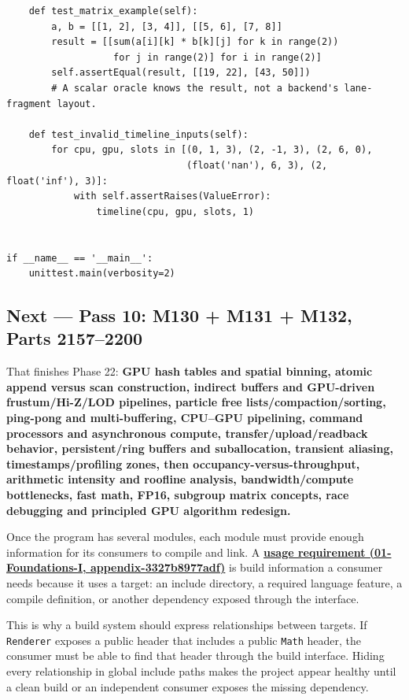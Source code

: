 \begin{verbatim}
    def test_matrix_example(self):
        a, b = [[1, 2], [3, 4]], [[5, 6], [7, 8]]
        result = [[sum(a[i][k] * b[k][j] for k in range(2))
                   for j in range(2)] for i in range(2)]
        self.assertEqual(result, [[19, 22], [43, 50]])
        # A scalar oracle knows the result, not a backend's lane-fragment layout.

    def test_invalid_timeline_inputs(self):
        for cpu, gpu, slots in [(0, 1, 3), (2, -1, 3), (2, 6, 0),
                                (float('nan'), 6, 3), (2, float('inf'), 3)]:
            with self.assertRaises(ValueError):
                timeline(cpu, gpu, slots, 1)


if __name__ == '__main__':
    unittest.main(verbosity=2)
\end{verbatim}

\subsection{Next --- Pass 10: M130 + M131 + M132, Parts 2157--2200}\label{03-visual-computing-i-ch016-next-pass-10-m130-m131-m132-parts-21572200}

That finishes Phase 22: \textbf{GPU hash tables and spatial binning, atomic append versus scan construction, indirect buffers and GPU-driven frustum/Hi-Z/LOD pipelines, particle free lists/compaction/sorting, ping-pong and multi-buffering, CPU--GPU pipelining, command processors and asynchronous compute, transfer/upload/readback behavior, persistent/ring buffers and suballocation, transient aliasing, timestamps/profiling zones, then occupancy-versus-throughput, arithmetic intensity and roofline analysis, bandwidth/compute bottlenecks, fast math, FP16, subgroup matrix concepts, race debugging and principled GPU algorithm redesign.}

Once the program has several modules, each module must provide enough information for its consumers to compile and link. A \textbf{\href{../01-Foundations-I/main.pdf\#nameddest=appendix-3327b8977adf}{usage requirement (01-Foundations-I, appendix-3327b8977adf)}} is build information a consumer needs because it uses a target: an include directory, a required language feature, a compile definition, or another dependency exposed through the interface.

This is why a build system should express relationships between targets. If \texttt{Renderer} exposes a public header that includes a public \texttt{Math} header, the consumer must be able to find that header through the build interface. Hiding every relationship in global include paths makes the project appear healthy until a clean build or an independent consumer exposes the missing dependency.

